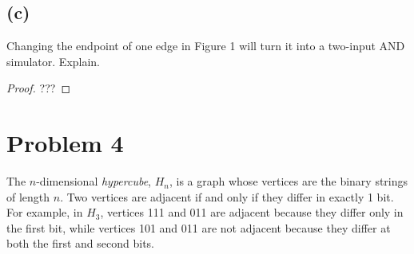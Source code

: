 \documentclass[14pt]{extarticle}
\begin{document}
\subsection{(c)}
Changing the endpoint of one edge in Figure 1 will turn it into a two-input AND simulator. Explain.
\begin{proof}
???
\end{proof}

\section{Problem 4}
The $n$-dimensional {\it hypercube}, $H_n$, is a graph whose vertices are the binary strings of length $n$. Two vertices are adjacent if and only if they differ in exactly 1 bit. For example, in $H_3$, vertices 111 and 011 are adjacent because they differ only in the first bit, while vertices 101 and 011 are not adjacent because they differ at both the first and second bits.
\end{document}

